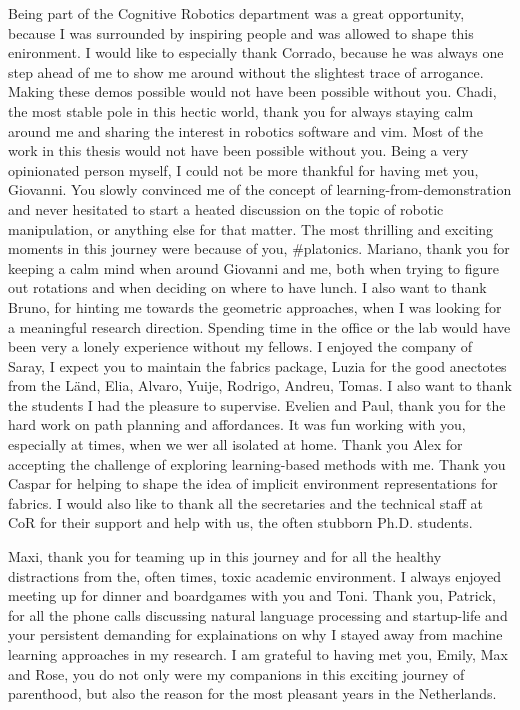 Being part of the Cognitive Robotics department was a great opportunity,
because I was surrounded by inspiring people and was allowed to shape this
enironment. I would like to especially thank Corrado, because he was always one
step ahead of me to show me around without the slightest trace of arrogance.
Making these demos possible would not have been possible without you. Chadi,
the most stable pole in this hectic world, thank you for always staying calm
around me and sharing the interest in robotics software and vim. Most of the
work in this thesis would not have been possible without you. Being a very
opinionated person myself, I could not be more thankful for having met you,
Giovanni. You slowly convinced me of the concept of learning-from-demonstration
and never hesitated to start a heated discussion on the topic of robotic
manipulation, or anything else for that matter. The most thrilling and exciting
moments in this journey were because of you, \#platonics. Mariano, thank you for
keeping a calm mind when around Giovanni and me, both when trying to figure out
rotations and when deciding on where to have lunch. I also want to thank Bruno,
for hinting me towards the geometric approaches, when I was looking for a
meaningful research direction. Spending time in the office or the lab would
have been very a lonely experience without my fellows. I enjoyed the company of
Saray, I expect you to maintain the fabrics package, Luzia for the good
anectotes from the Länd, Elia, Alvaro, Yuije, Rodrigo, Andreu, Tomas.
I also want to thank the students I had the pleasure to supervise. Evelien and
Paul, thank you for the hard work on path planning and affordances. It was fun
working with you, especially at times, when we wer all isolated at home. Thank
you Alex for accepting the challenge of exploring learning-based methods with
me. Thank you Caspar for helping to shape the idea of implicit environment
representations for \ac{fabrics}. I would also like to thank all the
secretaries and the technical staff at CoR for their support and help with us, 
the often stubborn Ph.D. students.

Maxi, thank you for teaming up in this journey and for all the healthy
distractions from the, often times, toxic academic environment. I always
enjoyed meeting up for dinner and boardgames with you and Toni. Thank you,
Patrick, for all the phone calls discussing natural language processing and
startup-life and your persistent demanding for explainations on why I stayed
away from machine learning approaches in my research. I am grateful to having
met you, Emily, Max and Rose, you do not only were my companions in this
exciting journey of parenthood, but also the reason for the most pleasant years
in the Netherlands.

